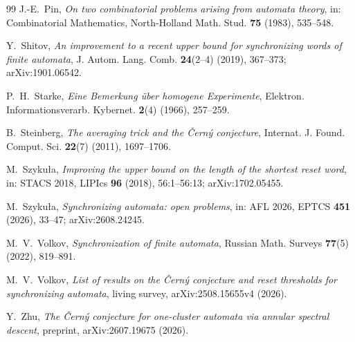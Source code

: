 \documentclass[11pt,a4paper]{article}
\theoremstyle{definition}
\theoremstyle{remark}
\begin{document}
\begin{thebibliography}{99}
J.-E.~Pin, \emph{On two combinatorial problems arising from automata theory}, in: Combinatorial Mathematics, North-Holland Math. Stud. \textbf{75} (1983), 535--548.

Y.~Shitov, \emph{An improvement to a recent upper bound for synchronizing words of finite automata}, J. Autom. Lang. Comb. \textbf{24}(2--4) (2019), 367--373; arXiv:1901.06542.

P.~H.~Starke, \emph{Eine Bemerkung \"uber homogene Experimente}, Elektron. Informationsverarb. Kybernet. \textbf{2}(4) (1966), 257--259.

B.~Steinberg, \emph{The averaging trick and the \v{C}ern\'y conjecture}, Internat. J. Found. Comput. Sci. \textbf{22}(7) (2011), 1697--1706.

M.~Szyku\l a, \emph{Improving the upper bound on the length of the shortest reset word}, in: STACS 2018, LIPIcs \textbf{96} (2018), 56:1--56:13; arXiv:1702.05455.

M.~Szyku\l a, \emph{Synchronizing automata: open problems}, in: AFL 2026, EPTCS \textbf{451} (2026), 33--47; arXiv:2608.24245.

M.~V.~Volkov, \emph{Synchronization of finite automata}, Russian Math. Surveys \textbf{77}(5) (2022), 819--891.

M.~V.~Volkov, \emph{List of results on the \v{C}ern\'y conjecture and reset thresholds for synchronizing automata}, living survey, arXiv:2508.15655v4 (2026).

Y.~Zhu, \emph{The \v{C}ern\'y conjecture for one-cluster automata via annular spectral descent}, preprint, arXiv:2607.19675 (2026).

\end{thebibliography}
\end{document}
